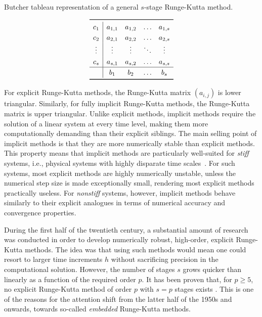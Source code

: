 \begin{table}[htpb]
    \centering
    \caption[Butcher tableau representation of a general $s$-stage
                Runge-Kutta method]{Butcher tableau representation of a general
                    $s$-stage Runge-Kutta method.}
    \label{tab:generalbutcher}
    \[\renewcommand{\arraystretch}{1.25}
        \begin{array}{c|cccc}
            \toprule
            c_{1} & a_{1,1} & a_{1,2} & \ldots & a_{1,s}\\
            c_{2} & a_{2,1} & a_{2,2} & \ldots & a_{2,s}\\
            \vdots & \vdots & \vdots & \ddots & \vdots \\
            c_{s} & a_{s,1} & a_{s,2} & \ldots & a_{s,s}\\
            \hline
            & b_{1} & b_{2} & \ldots & b_{s}\\
            \bottomrule
    \end{array}
\]
\end{table}

For explicit Runge-Kutta methods, the Runge-Kutta matrix $(a_{i,j})$ is lower
triangular. Similarly, for fully implicit Runge-Kutta methods, the Runge-Kutta
matrix is upper triangular. Unlike explicit methods, implicit methods require
the solution of a linear system at every time level, making them more
computationally demanding than their explicit siblings. The main selling point
of implicit methods is that they are more numerically stable than explicit
methods. This property means that implicit methods are particularly well-suited
for \emph{stiff} systems, i.e., physical systems with highly disparate time
scales~\parencite[p.2]{hairer1996solving}. For such systems,
most explicit methods are highly numerically unstable, unless the numerical step
size is made exceptionally small, rendering most explicit methods practically
useless. For \emph{nonstiff} systems, however, implicit methods behave similarly
to their explicit analogues in terms of numerical accuracy and
convergence properties.

During the first half of the twentieth century, a substantial amount of research
was conducted in order to develop numerically robust, high-order, explicit
Runge-Kutta methods. The idea was that using such methods would mean one could
resort to larger time increments $h$ without sacrificing precision in the
computational solution. However, the number of stages $s$ grows quicker than
linearly as a function of the required order $p$. It has been proven
that, for $p\geq5$, no explicit Runge-Kutta method of order $p$ with $s=p$
stages exists \parencite[p.173]{hairer1993solving}. This is
one of the reasons for the attention shift from the latter half of the 1950s
and onwards, towards so-called \emph{embedded} Runge-Kutta methods.

